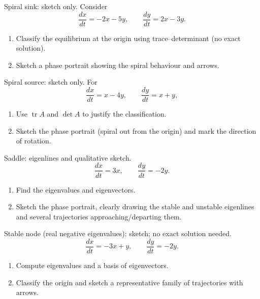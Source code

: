\documentclass[11pt]{article}
\def\textbf#1{#1}%
\newcounter{question}
\begin{document}
\begin{question}
\textbf{Spiral sink: sketch only.}
Consider
\[
\frac{dx}{dt}=-2x-5y,\qquad \frac{dy}{dt}=2x-3y.
\]
\begin{enumerate}
  \item Classify the equilibrium at the origin using trace–determinant (no exact solution).
  \item Sketch a phase portrait showing the spiral behaviour and arrows.
\end{enumerate}
\end{question}

\begin{question}
\textbf{Spiral source: sketch only.}
For
\[
\frac{dx}{dt}=x-4y,\qquad \frac{dy}{dt}=x+y,
\]
\begin{enumerate}
  \item Use $\operatorname{tr}A$ and $\det A$ to justify the classification.
  \item Sketch the phase portrait (spiral out from the origin) and mark the direction of rotation.
\end{enumerate}
\end{question}

\begin{question}
\textbf{Saddle: eigenlines and qualitative sketch.}
\[
\frac{dx}{dt}=3x,\qquad \frac{dy}{dt}=-2y.
\]
\begin{enumerate}
  \item Find the eigenvalues and eigenvectors.
  \item Sketch the phase portrait, clearly drawing the stable and unstable eigenlines and several trajectories approaching/departing them.
\end{enumerate}
\end{question}

\begin{question}
\textbf{Stable node (real negative eigenvalues): sketch; no exact solution needed.}
\[
\frac{dx}{dt}=-3x+y,\qquad \frac{dy}{dt}=-2y.
\]
\begin{enumerate}
  \item Compute eigenvalues and a basis of eigenvectors.
  \item Classify the origin and sketch a representative family of trajectories with arrows.
\end{enumerate}
\end{question}
\end{document}
